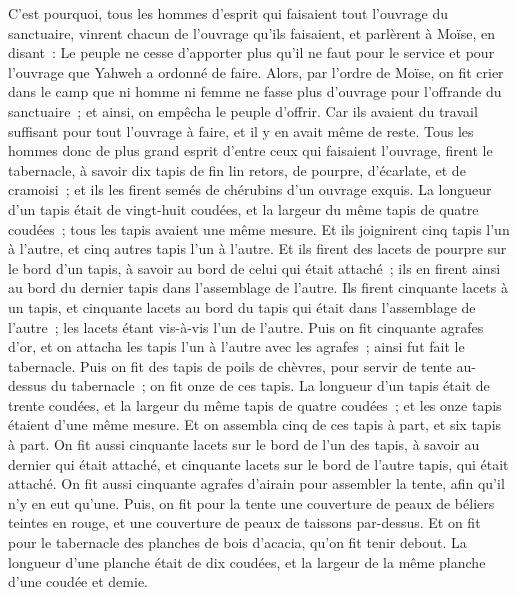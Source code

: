 \begin{multicols}{2}
C'est pourquoi, tous les hommes d'esprit qui faisaient tout l'ouvrage du sanctuaire, vinrent chacun de l'ouvrage qu'ils faisaient,
et parlèrent à Moïse, en disant~: Le peuple ne cesse d'apporter plus qu'il ne faut pour le service et pour l'ouvrage que Yahweh a ordonné de faire.
Alors, par l'ordre de Moïse, on fit crier dans le camp que ni homme ni femme ne fasse plus d'ouvrage pour l'offrande du sanctuaire~; et ainsi, on empêcha le peuple d'offrir.
Car ils avaient du travail suffisant pour tout l'ouvrage à faire, et il y en avait même de reste.
Tous les hommes donc de plus grand esprit d'entre ceux qui faisaient l'ouvrage, firent le tabernacle, à savoir dix tapis de fin lin retors, de pourpre, d'écarlate, et de cramoisi~; et ils les firent semés de chérubins d'un ouvrage exquis.
La longueur d'un tapis était de vingt-huit coudées, et la largeur du même tapis de quatre coudées~; tous les tapis avaient une même mesure.
Et ils joignirent cinq tapis l'un à l'autre, et cinq autres tapis l'un à l'autre.
Et ils firent des lacets de pourpre sur le bord d'un tapis, à savoir au bord de celui qui était attaché~; ils en firent ainsi au bord du dernier tapis dans l'assemblage de l'autre.
Ils firent cinquante lacets à un tapis, et cinquante lacets au bord du tapis qui était dans l'assemblage de l'autre~; les lacets étant vis-à-vis l'un de l'autre.
Puis on fit cinquante agrafes d'or, et on attacha les tapis l'un à l'autre avec les agrafes~; ainsi fut fait le tabernacle.
Puis on fit des tapis de poils de chèvres, pour servir de tente au-dessus du tabernacle~; on fit onze de ces tapis.
La longueur d'un tapis était de trente coudées, et la largeur du même tapis de quatre coudées~; et les onze tapis étaient d'une même mesure.
Et on assembla cinq de ces tapis à part, et six tapis à part.
On fit aussi cinquante lacets sur le bord de l'un des tapis, à savoir au dernier qui était attaché, et cinquante lacets sur le bord de l'autre tapis, qui était attaché.
On fit aussi cinquante agrafes d'airain pour assembler la tente, afin qu'il n'y en eut qu'une.
Puis, on fit pour la tente une couverture de peaux de béliers teintes en rouge, et une couverture de peaux de taissons par-dessus.
Et on fit pour le tabernacle des planches de bois d'acacia, qu'on fit tenir debout.
La longueur d'une planche était de dix coudées, et la largeur de la même planche d'une coudée et demie.

\end{multicols}
